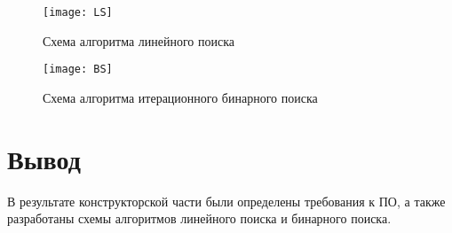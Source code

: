 \begin{figure}[h]
	\centering
	\texttt{[image: LS]}
	\caption{Схема алгоритма линейного поиска}
	\label{fig:LS}
\end{figure}


\begin{figure}[h]
	\centering
	\texttt{[image: BS]}
	\caption{Схема алгоритма итерационного бинарного поиска}
	\label{fig:BS}
\end{figure}

\clearpage

\section{Вывод}

В результате конструкторской части были определены требования к ПО, а также разработаны схемы алгоритмов линейного поиска и бинарного поиска.

\clearpage
